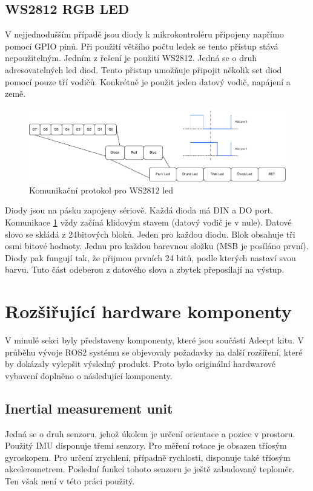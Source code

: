 \subsection*{WS2812 RGB LED}
V nejjednodušším případě jsou diody k mikrokontroléru připojeny napřímo pomocí GPIO pinů. Při použití většího počtu ledek se tento přístup stává nepoužitelným. Jedním z řešení je použití WS2812. Jedná se o druh adresovatelných led diod. Tento přistup umožňuje připojit několik set diod pomocí pouze tří vodičů. Konkrétně je použit jeden datový vodič, napájení a země.\cite[str:~2]{ws2812}

\begin{figure}[h!]
	\centering
	\includegraphics[scale=0.6]{obrazky-figures/ws2812_led.pdf}
	\caption{Komunikační protokol pro WS2812 led}
	\label{fig:ws2812_protocol}
\end{figure}

Diody jsou na pásku zapojeny sériově. Každá dioda má DIN a DO port. Komunikace \ref{fig:ws2812_protocol} vždy začíná klidovým stavem (datový vodič je v nule). Datové slovo se skládá z 24bitových bloků. Jeden pro každou diodu. Blok obsahuje tři osmi bitové hodnoty. Jednu pro každou barevnou složku (MSB je posíláno první). Diody pak fungují tak, že přijmou prvních 24 bitů, podle kterých nastaví svou barvu. Tuto část odeberou z datového slova a zbytek přeposílají na výstup. \cite[str:~4]{ws2812}

\section{Rozšiřující hardware komponenty}
V minulé sekci byly představeny komponenty, které jsou součástí Adeept kitu. V průběhu vývoje ROS2 systému se objevovaly požadavky na další rozšíření, které by dokázaly vylepšit výsledný produkt. Proto bylo originální hardwarové vybavení doplněno o následující komponenty.

\subsection*{Inertial measurement unit}
Jedná se o druh senzoru, jehož úkolem je určení orientace a pozice v prostoru. Použitý IMU disponuje třemi senzory. Pro měření rotace je obsazen tříosým gyroskopem. Pro určení zrychlení, případně rychlosti, disponuje také tříosým akcelerometrem. Poslední funkcí tohoto senzoru je ještě zabudovaný teploměr. Ten však není v této práci použitý.

